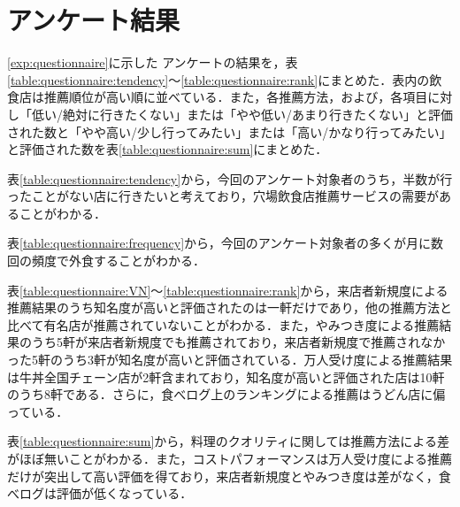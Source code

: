 	\section{アンケート結果}
	\ref{exp:questionnaire}に示した
	アンケートの結果を，表\ref{table:questionnaire:tendency}〜\ref{table:questionnaire:rank}にまとめた．表内の飲食店は推薦順位が高い順に並べている．また，各推薦方法，および，各項目に対し「低い/絶対に行きたくない」または「やや低い/あまり行きたくない」と評価された数と「やや高い/少し行ってみたい」または「高い/かなり行ってみたい」と評価された数を表\ref{table:questionnaire:sum}にまとめた．
	
	
	
	
	
	
	
	\par
	表\ref{table:questionnaire:tendency}から，今回のアンケート対象者のうち，半数が行ったことがない店に行きたいと考えており，穴場飲食店推薦サービスの需要があることがわかる．\par
	表\ref{table:questionnaire:frequency}から，今回のアンケート対象者の多くが月に数回の頻度で外食することがわかる．\par
	表\ref{table:questionnaire:VN}〜\ref{table:questionnaire:rank}から，来店者新規度による推薦結果のうち知名度が高いと評価されたのは一軒だけであり，他の推薦方法と比べて有名店が推薦されていないことがわかる．また，やみつき度による推薦結果のうち5軒が来店者新規度でも推薦されており，来店者新規度で推薦されなかった5軒のうち3軒が知名度が高いと評価されている．万人受け度による推薦結果は牛丼全国チェーン店が2軒含まれており，知名度が高いと評価された店は10軒のうち8軒である．さらに，食べログ上のランキングによる推薦はうどん店に偏っている．\par
	表\ref{table:questionnaire:sum}から，料理のクオリティに関しては推薦方法による差がほぼ無いことがわかる．また，コストパフォーマンスは万人受け度による推薦だけが突出して高い評価を得ており，来店者新規度とやみつき度は差がなく，食べログは評価が低くなっている．

